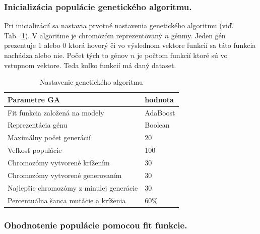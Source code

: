 \documentclass[runningheads]{llncs}
\begin{document}
\subsubsection{Inicializácia populácie genetického algoritmu.}

Pri inicializácií sa nastavia prvotné nastavenia genetického algoritmu (viď. Tab.~\ref{tab_nastavenie_gen_alg}). 
V algoritme je chromozóm reprezentovaný \begin{math}n\end{math} génmy. Jeden gén prezentuje \begin{math}1\end{math} 
alebo \begin{math}0\end{math} ktorá hovorý či vo výslednom vektore funkcií sa táto funkcia nachádza alebo nie. 
Počet tých to génov \begin{math}n\end{math} je počtom funkcií ktoré sú vo vstupnom vektore. Teda 
koľko funkcií má daný dataset.

\begin{table}[]
\centering
\caption{Nastavenie genetického algoritmu}\label{tab_nastavenie_gen_alg}
\begin{tabular}{|l|l|}
\hline
\textbf{Parametre GA}                    & \textbf{hodnota}  \\ \hline
Fit funkcia založená na modely           & AdaBoost \\ \hline
Reprezentácia génu                       & Boolean  \\ \hline
Maximálny počet generácií                & 20       \\ \hline
Veľkosť populácie                        & 100      \\ \hline
Chromozómy vytvorené krížením            & 30       \\ \hline
Chromozómy vytvorené generovaním         & 30       \\ \hline
Najlepšie chromozómy z minulej generácie & 30       \\ \hline
Percentuálna šanca mutácie a kríženia    & 60\%     \\ \hline
\end{tabular}
\end{table}

\subsubsection{Ohodnotenie populácie pomocou fit funkcie.}
\end{document}
